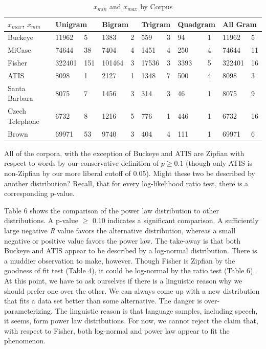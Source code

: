 \documentclass[12pt]{article}
\begin{document}
\begin{table}[H]
\caption{$x_{min}$ and $x_{max}$ by Corpus}
\begin{center}
\begin{tabular}{| *{11}{l|} }
    \hline
$x_{max}$, $x_{min}$    & \multicolumn{2}{l|}{Unigram}
            & \multicolumn{2}{l|}{Bigram}
                    & \multicolumn{2}{l|}{Trigram}
                            & \multicolumn{2}{l|}{Quadgram} 
                            & \multicolumn{2}{l|}{All Gram}\\
    \hline
Buckeye   &   11962  &   5  & 1383 & 2&   559  &   3  &   94  &   1  &   11962  &   5  \\
    \hline
MiCase   &   74644  &   38  &   7404  &   4  &   1451  &   4  &   250  &   4 & 74644 & 11  \\
    \hline
Fisher   &  322401 & 151 & 101464 & 3 & 17536 & 3 & 3393 & 5 & 322401 & 16\\
    \hline
ATIS   &  8098     &    1   &   2127    &   1    &      1348 &  7     &     500  &      4 & 8098 & 3 \\
    \hline
Santa Barbara   &  8075     &   7    &  1456     &      3 & 314& 3&  46      & 1      & 8075      &      9 \\    \hline
Czech Telephone   &   6732    &     8  &    1216   &    5   &  776     &     1  & 446       & 1     & 6732 & 16  \\
    \hline
Brown & 69971 & 53 & 9740 & 3 & 404 & 4 & 111 & 1 & 69971 & 6 \\
    \hline
\end{tabular}
\end{center}
\end{table}

All of the corpora, with the exception of Buckeye and ATIS are Zipfian with respect to words by our conservative definition of $p \geq{0.1}$ (though only ATIS is non-Zipfian by our more liberal cutoff of 0.05).  Might these two be described by another distribution?   Recall, that for every log-likelihood ratio test, there is a corresponding p-value.  

Table 6 shows the comparison of the power law distribution to other distributions.   A p-value $\geq$ 0.10 indicates a significant comparison.  A sufficiently large negative \emph{R} value favors the alternative distribution, whereas a small negative or positive value favors the power law. The take-away is that both Buckeye and ATIS appear to be described by a log-normal distribution.  There is a muddier observation to make, however.   Though Fisher is Zipfian by the goodness of fit test (Table 4), it could be log-normal by the ratio test (Table 6). At this point, we have to ask ourselves if there is a linguistic reason why we should prefer one over the other.  We can always come up with a new distribution that fits a data set better than some alternative.  The danger is over-parameterizing.  The linguistic reason is that language samples, including speech, it seems, form power law distributions.  For now, we cannot reject the claim that, with respect to Fisher, both log-normal and power law appear to fit the phenomenon.  
\end{document}
